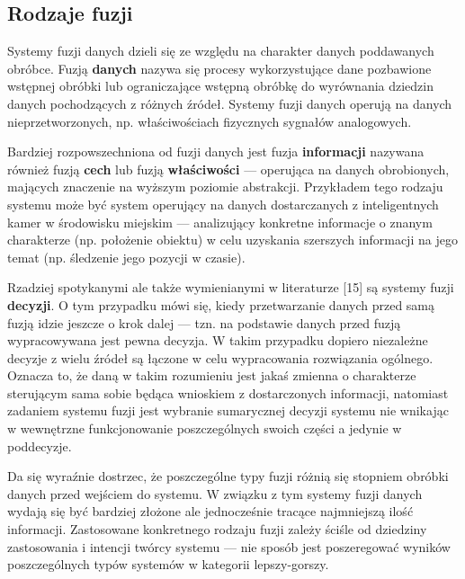 \subsection{Rodzaje fuzji}
\par{
Systemy fuzji danych dzieli się ze względu na charakter danych poddawanych obróbce. Fuzją \textbf{danych} nazywa się procesy wykorzystujące dane pozbawione wstępnej obróbki lub ograniczające wstępną obróbkę do wyrównania dziedzin danych pochodzących z różnych źródeł. Systemy fuzji danych operują na danych nieprzetworzonych, np. właściwościach fizycznych sygnałów analogowych.
}
\par{
Bardziej rozpowszechniona od fuzji danych jest fuzja \textbf{informacji} nazywana również fuzją \textbf{cech} lub fuzją \textbf{właściwości} --- operująca na danych obrobionych, mających znaczenie na wyższym poziomie abstrakcji. Przykładem tego rodzaju systemu może być system operujący na danych dostarczanych z inteligentnych kamer w środowisku miejskim --- analizujący konkretne informacje o znanym charakterze (np. położenie obiektu) w celu uzyskania szerszych informacji na jego temat (np. śledzenie jego pozycji w czasie).
}
\par{
Rzadziej spotykanymi ale także wymienianymi w literaturze [15] są systemy fuzji \textbf{decyzji}. O tym przypadku mówi się, kiedy przetwarzanie danych przed samą fuzją idzie jeszcze o krok dalej --- tzn. na podstawie danych przed fuzją wypracowywana jest pewna decyzja. W takim przypadku dopiero niezależne decyzje z wielu źródeł są łączone w celu wypracowania rozwiązania ogólnego. Oznacza to, że daną w takim rozumieniu jest jakaś zmienna o charakterze sterującym sama sobie będąca wnioskiem z dostarczonych informacji, natomiast zadaniem systemu fuzji jest wybranie sumarycznej decyzji systemu nie wnikając w wewnętrzne funkcjonowanie poszczególnych swoich części a jedynie w poddecyzje.
}
\par{
Da się wyraźnie dostrzec, że poszczególne typy fuzji różnią się stopniem obróbki danych przed wejściem do systemu. W związku z tym systemy fuzji danych wydają się być bardziej złożone ale jednocześnie tracące najmniejszą ilość informacji. Zastosowane konkretnego rodzaju fuzji zależy ściśle od dziedziny zastosowania i intencji twórcy systemu --- nie sposób jest poszeregować wyników poszczególnych typów systemów w kategorii lepszy-gorszy.
}
